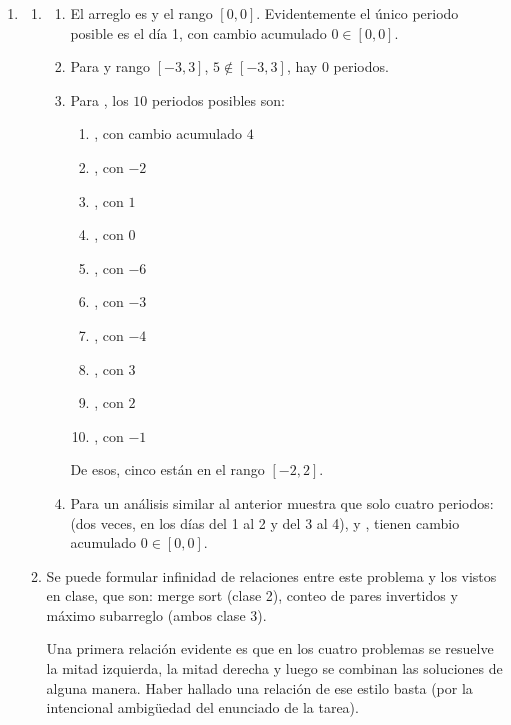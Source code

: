 \begin{enumerate}
  \item
  \begin{enumerate}
    \item
    \begin{enumerate}[start=1, label=Caso \arabic*:, leftmargin=*]
      \item El arreglo es \inline{[0]} y el rango $[0, 0]$. Evidentemente el único periodo posible es el día 1, con cambio acumulado $0 \in [0, 0]$.
      \item Para \inline{[5]} y rango $[-3, 3]$, $5 \notin [-3, 3]$, hay $0$ periodos.
      \item Para \inline{[4, -6, 3, -1]}, los $10$ periodos posibles son:
      \begin{enumerate}[label=\arabic*.]
        \item \inline{[4]}, con cambio acumulado $4$
        \item \inline{[4, -6]}, con $-2$
        \item \inline{[4, -6, 3]}, con $1$
        \item \inline{[4, -6, 3, -1]}, con $0$
        \item \inline{[-6]}, con $-6$
        \item \inline{[-6, 3]}, con $-3$
        \item \inline{[-6, 3, -1]}, con $-4$
        \item \inline{[3]}, con $3$
        \item \inline{[3, -1]}, con $2$
        \item \inline{[-1]}, con $-1$
      \end{enumerate}
      De esos, cinco están en el rango $[-2, 2]$.
      \item Para \inline{[1, -1, 1, -1]} un análisis similar al anterior muestra que solo cuatro periodos: \inline{[1, -1]} (dos veces, en los días del 1 al 2 y del 3 al 4), \inline{[-1, 1]} y \inline{[1, -1, 1, -1]}, tienen cambio acumulado $0 \in [0, 0]$.
    \end{enumerate}

    \item Se puede formular infinidad de relaciones entre este problema y los vistos en clase, que son: merge sort (clase 2), conteo de pares invertidos y máximo subarreglo (ambos clase 3).

    \medskip
    Una primera relación evidente es que en los cuatro problemas se resuelve la mitad izquierda, la mitad derecha y luego se combinan las soluciones de alguna manera. Haber hallado una relación de ese estilo basta (por la intencional ambigüedad del enunciado de la tarea).


\end{enumerate}
\end{enumerate}
